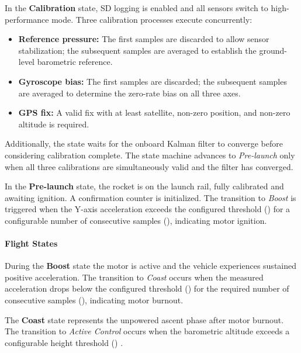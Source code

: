 In the \textbf{Calibration} state, SD logging is enabled and all sensors switch to high-performance mode. Three calibration processes execute concurrently:
\begin{itemize}
    \item \textbf{Reference pressure:} The first  samples are discarded to allow sensor stabilization; the subsequent  samples are averaged to establish the ground-level barometric reference.
    \item \textbf{Gyroscope bias:} The first  samples are discarded; the subsequent  samples are averaged to determine the zero-rate bias on all three axes.
    \item \textbf{GPS fix:} A valid fix with at least  satellite, non-zero position, and non-zero altitude is required.
\end{itemize}
Additionally, the state waits for the onboard Kalman filter to converge before considering calibration complete. The state machine advances to \emph{Pre-launch} only when all three calibrations are simultaneously valid and the filter has converged.

In the \textbf{Pre-launch} state, the rocket is on the launch rail, fully calibrated and awaiting ignition. A confirmation counter is initialized. The transition to \emph{Boost} is triggered when the Y-axis acceleration exceeds the configured threshold () for a configurable number of consecutive samples (), indicating motor ignition.

\paragraph{Flight States}

During the \textbf{Boost} state the motor is active and the vehicle experiences sustained positive acceleration. The transition to \emph{Coast} occurs when the measured acceleration drops below the configured threshold () for the required number of consecutive samples (), indicating motor burnout.

The \textbf{Coast} state represents the unpowered ascent phase after motor burnout. The transition to \emph{Active Control} occurs when the barometric altitude exceeds a configurable height threshold () .

